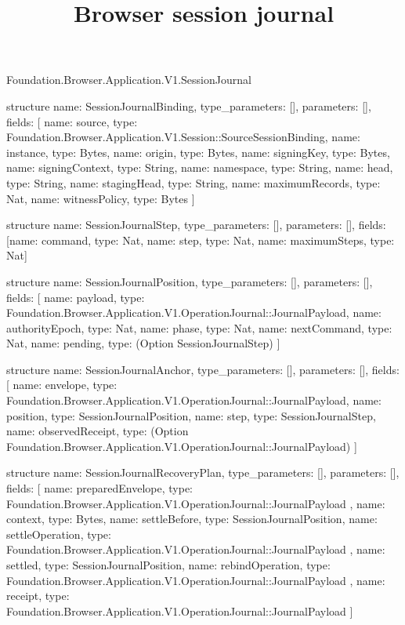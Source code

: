 \begin{lexlean}{Foundation.Browser.Application.V1.SessionJournal}
\title{Browser session journal}
\begin{semanticmodule}
structure{
  name: SessionJournalBinding,
  type_parameters: [],
  parameters: [],
  fields: [
    {name: source, type: Foundation.Browser.Application.V1.Session::SourceSessionBinding},
    {name: instance, type: Bytes},
    {name: origin, type: Bytes},
    {name: signingKey, type: Bytes},
    {name: signingContext, type: String},
    {name: namespace, type: String},
    {name: head, type: String},
    {name: stagingHead, type: String},
    {name: maximumRecords, type: Nat},
    {name: witnessPolicy, type: Bytes}
  ]
}

structure{
  name: SessionJournalStep,
  type_parameters: [],
  parameters: [],
  fields: [{name: command, type: Nat}, {name: step, type: Nat}, {name: maximumSteps, type: Nat}]
}

structure{
  name: SessionJournalPosition,
  type_parameters: [],
  parameters: [],
  fields: [
    {name: payload, type: Foundation.Browser.Application.V1.OperationJournal::JournalPayload},
    {name: authorityEpoch, type: Nat},
    {name: phase, type: Nat},
    {name: nextCommand, type: Nat},
    {name: pending, type: (Option SessionJournalStep)}
  ]
}

structure{
  name: SessionJournalAnchor,
  type_parameters: [],
  parameters: [],
  fields: [
    {name: envelope, type: Foundation.Browser.Application.V1.OperationJournal::JournalPayload},
    {name: position, type: SessionJournalPosition},
    {name: step, type: SessionJournalStep},
    {
      name: observedReceipt,
      type: (Option Foundation.Browser.Application.V1.OperationJournal::JournalPayload)
    }
  ]
}

structure{
  name: SessionJournalRecoveryPlan,
  type_parameters: [],
  parameters: [],
  fields: [
    {
      name: preparedEnvelope,
      type: Foundation.Browser.Application.V1.OperationJournal::JournalPayload
    },
    {name: context, type: Bytes},
    {name: settleBefore, type: SessionJournalPosition},
    {
      name: settleOperation,
      type: Foundation.Browser.Application.V1.OperationJournal::JournalPayload
    },
    {name: settled, type: SessionJournalPosition},
    {
      name: rebindOperation,
      type: Foundation.Browser.Application.V1.OperationJournal::JournalPayload
    },
    {name: receipt, type: Foundation.Browser.Application.V1.OperationJournal::JournalPayload}
  ]
}


\end{semanticmodule}
\end{lexlean}
